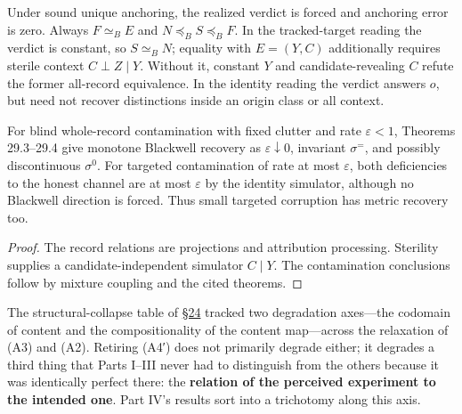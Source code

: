 

\begin{thmplain}

Under sound unique anchoring, the realized verdict is forced and anchoring error is zero. Always \(F\simeq_B E\) and \(N\preceq_B S\preceq_B F\). In the tracked-target reading the verdict is constant, so \(S\simeq_B N\); equality with \(E=(Y,C)\) additionally requires sterile context \(C\perp Z\mid Y\). Without it, constant \(Y\) and candidate-revealing \(C\) refute the former all-record equivalence. In the identity reading the verdict answers \(o\), but need not recover distinctions inside an origin class or all context.

For blind whole-record contamination with fixed clutter and rate \(\varepsilon<1\), Theorems 29.3--29.4 give monotone Blackwell recovery as \(\varepsilon\downarrow0\), invariant \(\sigma^=\), and possibly discontinuous \(\sigma^0\). For targeted contamination of rate at most \(\varepsilon\), both deficiencies to the honest channel are at most \(\varepsilon\) by the identity simulator, although no Blackwell direction is forced. Thus small targeted corruption has metric recovery too.
\end{thmplain}

\begin{proof}

The record relations are projections and attribution processing. Sterility supplies a candidate-independent simulator \(C\mid Y\). The contamination conclusions follow by mixture coupling and the cited theorems.
\end{proof}


The structural-collapse table of \hyperlink{sec:24}{§24} tracked two degradation axes---\hspace{0pt}the codomain of content and the compositionality of the content map---\hspace{0pt}across the relaxation of (A3) and (A2). Retiring (A4′) does not primarily degrade either; it degrades a third thing that Parts I--III never had to distinguish from the others because it was identically perfect there: the \textbf{relation of the perceived experiment to the intended one}. Part IV's results sort into a trichotomy along this axis.

